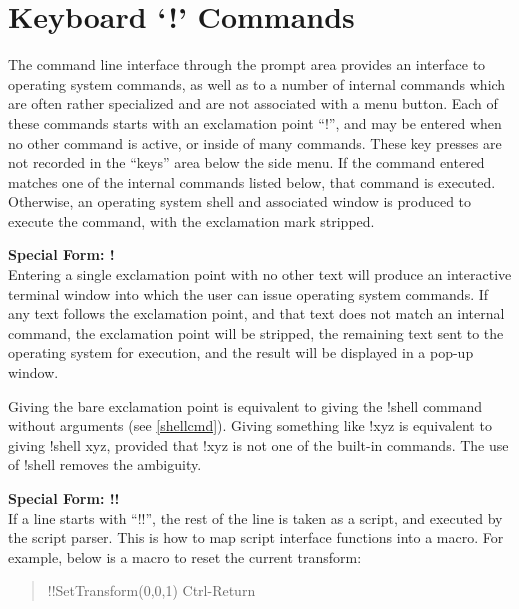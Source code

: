 
\chapter{Keyboard `{\cb !}' Commands}
\label{bangcmds}

The command line interface through the prompt area provides an
interface to operating system commands, as well as to a number of
internal commands which are often rather specialized and are not
associated with a menu button.  Each of these commands starts with an
exclamation point ``{\cb !}'', and may be entered when no other
command is active, or inside of many commands.  These key presses are
not recorded in the ``keys'' area below the side menu.  If the command
entered matches one of the internal commands listed below, that
command is executed.  Otherwise, an operating system shell and
associated window is produced to execute the command, with the
exclamation mark stripped.

{\bf Special Form:  !}\\
Entering a single exclamation point with no other text will produce an
interactive terminal window into which the user can issue operating
system commands.  If any text follows the exclamation point, and that
text does not match an internal command, the exclamation point will be
stripped, the remaining text sent to the operating system for
execution, and the result will be displayed in a pop-up window.

Giving the bare exclamation point is equivalent to giving the {\cb
!shell} command without arguments (see \ref{shellcmd}).  Giving
something like {\vt !xyz} is equivalent to giving {\vt !shell xyz},
provided that {\vt !xyz} is not one of the built-in commands.  The use
of {\vt !shell} removes the ambiguity.

{\bf Special Form:  !!}\\
If a line starts with ``{\cb !!}'', the rest of the line is taken as a
script, and executed by the script parser.  This is how to map script
interface functions into a macro.  For example, below is a macro to reset
the current transform:
\begin{quote}
{\vt !!SetTransform(0,0,1)} {\kb Ctrl-Return}
\end{quote}

